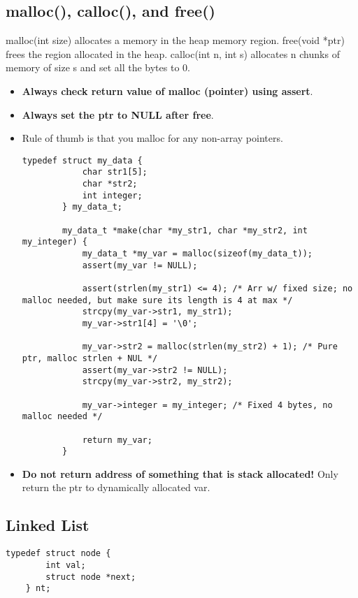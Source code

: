 \documentclass{article}
\begin{document}
\subsection{malloc(), calloc(), and free()}
malloc(int size) allocates a memory in the heap memory region. free(void *ptr) frees the region allocated in the heap.
calloc(int n, int s) allocates n chunks of memory of size s and set all the bytes to 0.
\begin{itemize}
    \item \textbf{Always check return value of malloc (pointer) using assert}.
    \item \textbf{Always set the ptr to NULL after free}.
    \item Rule of thumb is that you malloc for any non-array pointers.
    \begin{lstlisting}[style=CStyle]
        typedef struct my_data {
            char str1[5];
            char *str2;
            int integer;
        } my_data_t;

        my_data_t *make(char *my_str1, char *my_str2, int my_integer) {
            my_data_t *my_var = malloc(sizeof(my_data_t));
            assert(my_var != NULL);

            assert(strlen(my_str1) <= 4); /* Arr w/ fixed size; no malloc needed, but make sure its length is 4 at max */
            strcpy(my_var->str1, my_str1);
            my_var->str1[4] = '\0';

            my_var->str2 = malloc(strlen(my_str2) + 1); /* Pure ptr, malloc strlen + NUL */
            assert(my_var->str2 != NULL);
            strcpy(my_var->str2, my_str2);

            my_var->integer = my_integer; /* Fixed 4 bytes, no malloc needed */

            return my_var;
        }
    \end{lstlisting}
    \item \textbf{Do not return address of something that is stack allocated!} Only return the ptr to dynamically allocated var.
\end{itemize}

\subsection{Linked List}
\begin{lstlisting}[style=CStyle]
    typedef struct node {
        int val;
        struct node *next;
    } nt;
\end{lstlisting}
\end{document}
